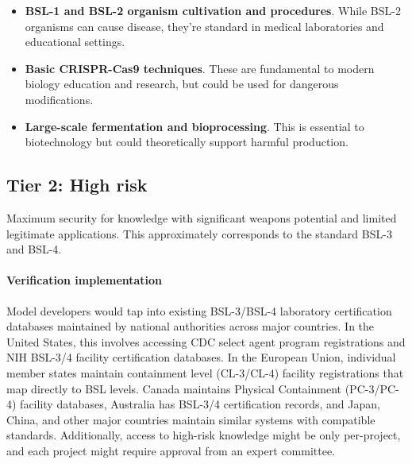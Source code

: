 \documentclass{article}
\theoremstyle{plain}
\theoremstyle{definition}
\theoremstyle{remark}
\begin{document}
\begin{itemize}
  \item \textbf{BSL-1 and BSL-2 organism cultivation and procedures}. While BSL-2 organisms can cause disease, they're standard in medical laboratories and educational settings.
  \item \textbf{Basic CRISPR-Cas9 techniques}. These are fundamental to modern biology education and research, but could be used for dangerous modifications.
  \item \textbf{Large-scale fermentation and bioprocessing}. This is essential to biotechnology but could theoretically support harmful production.
\end{itemize}

\subsection{Tier 2: High risk}

Maximum security for knowledge with significant weapons potential and limited legitimate applications. This approximately corresponds to the standard BSL-3 and BSL-4.

\paragraph{Verification implementation} Model developers would tap into existing BSL-3/BSL-4 laboratory certification databases maintained by national authorities across major countries. In the United States, this involves accessing CDC select agent program registrations and NIH BSL-3/4 facility certification databases. In the European Union, individual member states maintain containment level (CL-3/CL-4) facility registrations that map directly to BSL levels. Canada maintains Physical Containment (PC-3/PC-4) facility databases, Australia has BSL-3/4 certification records, and Japan, China, and other major countries maintain similar systems with compatible standards. Additionally, access to high-risk knowledge might be only per-project, and each project might require approval from an expert committee.
\end{document}
